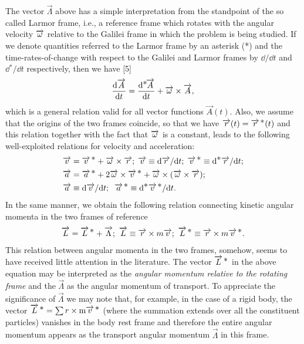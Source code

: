 The vector $\vec{\Lambda}$ above has a simple 
interpretation 
from the  standpoint of the so called Larmor frame, i.e., a 
reference frame which rotates with the angular velocity 
$\overrightarrow{{\omega}}$ relative to the Galilei frame in which the 
problem is being studied. If we denote quantities referred 
to the Larmor frame by an asterisk (*) and the 
time-rates-of-change with respect to the Galilei and Larmor 
frames by $\dd{}/\dd t$ and $\dd{^*\!}/\dd t$ respectively, 
then we have [5] \[\frac{\mathrm{d}{\overrightarrow{A}}}{\mathrm{d}{t}} = \frac{\mathrm{d}{{}^{{\textstyle \ast}}\negthinspace{\overrightarrow{A}}}}{\mathrm{d} {{t}}} 
+ {\overrightarrow{{\omega}}}\times{\overrightarrow{A}}, \] which is a general 
relation valid for all vector functions $\vec{A}(t)$. Also, 
we assume that the origins of the two frames coincide, so 
that we have $\overrightarrow{r}(t) = {\overrightarrow{r}^{\,{\textstyle \ast}}}(t)$ and this relation 
together with the fact that $\overrightarrow{{\omega}}$ is a constant, 
leads to the following well-exploited relations for 
velocity 
and acceleration:
\begin{align}
& \overrightarrow{v} = {\overrightarrow{v}^{\,{\textstyle \ast}}} + {\overrightarrow{{\omega}}}\times{\overrightarrow{r}}; \;
   \overrightarrow{v} \equiv {\mathrm{d}\overrightarrow{r}}/{\mathrm{d} t}; \;
   {\overrightarrow{v}^{\,{\textstyle \ast}}} \equiv {\mathrm{d}^{\ensuremath{\textstyle \ast}}\overrightarrow{r}}/{\mathrm{d} t};
\label{eq:ln006}\\\notag
& \overrightarrow{a} = {\overrightarrow{a}^{\,{\textstyle \ast}}} + 2{\overrightarrow{{\omega}}}\times{\overrightarrow{v}^{\,{\ensuremath{\textstyle \ast}}}}
+{\overrightarrow{{\omega}}}\times{({\overrightarrow{\ensuremath{{\omega}}}}}\times{\overrightarrow{r}});\notag\\
   &\overrightarrow{a} \equiv {\mathrm{d}\overrightarrow{v}}/{\mathrm{d} t};
\;\;{\overrightarrow{a}^{\,{\textstyle \ast}}}\equiv \mathrm{d}^{\textstyle \ast} {\overrightarrow{v}^{\,{\textstyle \ast}}}/{\mathrm{d} t}.
\label{eq:ln007}
\end{align}
In the same manner, we obtain the following relation 
connecting kinetic angular momenta in the two frames of 
reference
\begin{align}
 \overrightarrow{L} = {\overrightarrow{L}^{\,{\textstyle \ast}}}+ \overrightarrow{\Lambda}; ~
    \overrightarrow{L} \equiv {\overrightarrow{r}}\times{m\overrightarrow{v}};~
    {\overrightarrow{L}^{\,{\textstyle \ast}}}\equiv {\overrightarrow{r}}\times{m\ensuremath{{\overrightarrow{v}^{\,{\textstyle \ast}}}}}.
\label{eq:ln008}
\end{align}
This relation between angular momenta in the two  
frames, somehow, seems to have received little attention in 
the literature. The vector ${\overrightarrow{L}^{\,{\textstyle \ast}}}$ in the above equation 
may be interpreted as the \textsl{angular momentum relative 
to the rotating frame} and the $\vec{\Lambda}$ as the 
angular momentum of transport. To appreciate the 
significance of $\vec{\Lambda}$ we may note that, for 
example, in the case of a rigid body, the vector ${\overrightarrow{L}^{\,{\textstyle \ast}}}= 
{\sum{r}}\times \mbox{m} {\ensuremath{{\overrightarrow{v}^{\,{\textstyle \ast}}}}}$ (where the summation 
extends over all the constituent particles) vanishes in the 
body rest frame and therefore the entire angular momentum 
appears as the transport angular momentum $\vec{\Lambda}$ 
in 
this frame.

